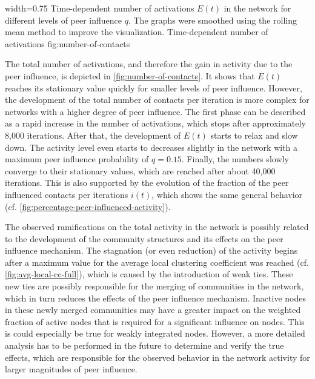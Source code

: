       {width=0.75\textwidth}
      {Time-dependent number of activations \( E(t) \) in the network for different levels of peer influence \( q \). The graphs were smoothed using the rolling mean method to improve the visualization.}
      {Time-dependent number of activations}
      {fig:number-of-contacts}


The total number of activations, and therefore the gain in activity due to the peer influence, is depicted in \cref{fig:number-of-contacts}.
It shows that \( E(t) \) reaches its stationary value quickly for smaller levels of peer influence.
However, the development of the total number of contacts per iteration is more complex for networks with a higher degree of peer influence.
The first phase can be described as a rapid increase in the number of activations, which stops after approximately 8,000 iterations.
After that, the development of \( E(t) \) starts to relax and slow down.
The activity level even starts to decreases slightly in the network with a maximum peer influence probability of \( q = 0.15 \).
Finally, the numbers slowly converge to their stationary values, which are reached after about 40,000 iterations.
This is also supported by the evolution of the fraction of the peer influenced contacts per iterations \( i(t) \), which shows the same general behavior (cf. \cref{fig:percentage-peer-influenced-activity}).

The observed ramifications on the total activity in the network is possibly related to the development of the community structures and its effects on the peer influence mechanism.
The stagnation (or even reduction) of the activity begins after a maximum value for the average local clustering coefficient was reached (cf. \cref{fig:avg-local-cc-full}), which is caused by the introduction of weak ties.
These new ties are possibly responsible for the merging of communities in the network, which in turn reduces the effects of the peer influence mechanism.
Inactive nodes in these newly merged communities may have a greater impact on the weighted fraction of active nodes that is required for a significant influence on nodes.
This is could especially be true for weakly integrated nodes.
However, a more detailed analysis has to be performed in the future to determine and verify the true effects, which are responsible for the observed behavior in the network activity for larger magnitudes of peer influence.


